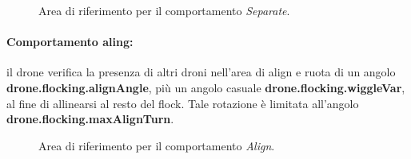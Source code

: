 \begin{figure}[H] 
    \captionsetup{justification=centering, margin=2cm, font=footnotesize}
    \begin{center}
    \end{center}
    \caption[short]{Area di riferimento per il comportamento \textit{Separate}.}
    \label{separate}
\end{figure}

\paragraph{Comportamento aling:} il drone verifica la presenza di altri droni nell'area di align e ruota di un angolo \textbf{drone.flocking.alignAngle}, più un angolo casuale \textbf{drone.flocking.wiggleVar}, al fine di allinearsi al resto del flock.
Tale rotazione è limitata all'angolo  \textbf{drone.flocking.maxAlignTurn}.

\begin{figure}[H] 
    \captionsetup{justification=centering, margin=2cm, font=footnotesize}
    \begin{center}
    \end{center}
    \caption[short]{Area di riferimento per il comportamento \textit{Align}.}
    \label{align}
\end{figure}

